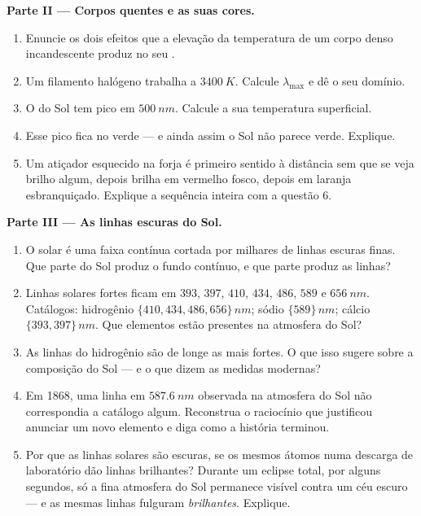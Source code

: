 \begin{problem}
\medskip
\noindent\textbf{Parte II --- Corpos quentes e as suas cores.}
\begin{enumerate}[resume]
  \item Enuncie os dois efeitos que a elevação da temperatura de um corpo
        denso incandescente produz no seu .
  \item Um filamento halógeno trabalha a $\qty{3400}{K}$. Calcule
        $\lambda_{\max}$ e dê o seu domínio.
  \item O  do Sol tem pico em $\qty{500}{nm}$. Calcule a
        sua temperatura superficial.
  \item Esse pico fica no verde --- e ainda assim o Sol não parece verde.
        Explique.
  \item Um atiçador esquecido na forja é primeiro sentido à distância sem
        que se veja brilho algum, depois brilha em vermelho fosco, depois em
        laranja esbranquiçado. Explique a sequência inteira com a questão 6.
\end{enumerate}

\medskip
\noindent\textbf{Parte III --- As linhas escuras do Sol.}
\begin{enumerate}[resume]
  \item O  solar é uma faixa contínua cortada por milhares de linhas
        escuras finas. Que parte do Sol produz o fundo contínuo, e que parte
        produz as linhas?
  \item Linhas solares fortes ficam em $393$, $397$, $410$, $434$, $486$,
        $589$ e $\qty{656}{nm}$. Catálogos: hidrogênio
        $\{410, 434, 486, 656\}\,\unit{nm}$; sódio $\{589\}\,\unit{nm}$;
        cálcio $\{393, 397\}\,\unit{nm}$. Que elementos estão presentes na
        atmosfera do Sol?
  \item As linhas do hidrogênio são de longe as mais fortes. O que isso
        sugere sobre a composição do Sol --- e o que dizem as medidas
        modernas?
  \item Em 1868, uma linha em $\qty{587.6}{nm}$ observada na atmosfera do
        Sol não correspondia a catálogo algum. Reconstrua o raciocínio que
        justificou anunciar um novo elemento e diga como a história
        terminou.
  \item Por que as linhas solares são escuras, se os mesmos átomos numa
        descarga de laboratório dão linhas brilhantes? Durante um eclipse
        total, por alguns segundos, só a fina atmosfera do Sol permanece
        visível contra um céu escuro --- e as mesmas linhas fulguram
        \emph{brilhantes}. Explique.
\end{enumerate}


\end{problem}
